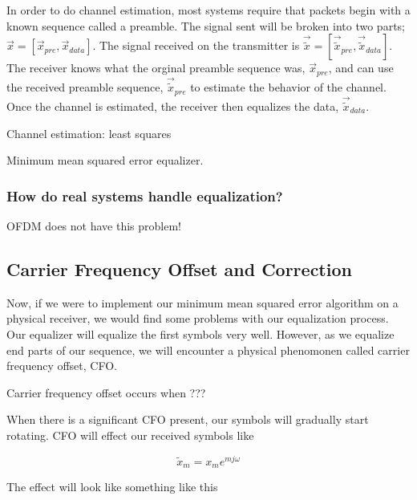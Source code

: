 In order to do channel estimation, most systems require that packets begin with a known sequence called a preamble. The signal sent will be broken into two parts; $\vec{x} = [\vec{x}_{pre}, \vec{x}_{data}]$.  The signal received on the transmitter is $\vec{\tilde{x}}=[\vec{\tilde{x}}_{pre},\vec{\tilde{x}}_{data}]$.  
The receiver knows what the orginal preamble sequence was, $\vec{x}_{pre}$, and can use the received preamble sequence, $\vec{\tilde{x}}_{pre}$ to estimate the behavior of the channel.
Once the channel is estimated, the receiver then equalizes the data, $\vec{\tilde{x}}_{data}$.

Channel estimation: least squares

Minimum mean squared error equalizer.
 
 

\subsubsection{How do real systems handle equalization?}

OFDM does not have this problem!

 
\subsection{Carrier Frequency Offset and Correction}

Now, if we were to implement our minimum mean squared error algorithm on a physical receiver, we would find some problems with our equalization process.  
Our equalizer will equalize the first symbols very well.  However, as we equalize end parts of our sequence, we will encounter a physical phenomonen called carrier frequency offset, CFO.

Carrier frequency offset occurs when ???

When there is a significant CFO present, our symbols will gradually start rotating. CFO will effect our received symbols like

$$\tilde{x}_m = x_m e^{mj\omega}$$


The effect will look like something like this 

